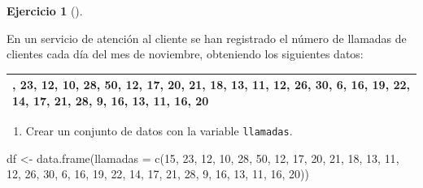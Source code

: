 \documentclass[
  a4paper,
]{scrreport}
\newenvironment{Shaded}{\begin{snugshade}}{\end{snugshade}}
\newcommand{\AttributeTok}[1]{\textcolor[rgb]{0.40,0.45,0.13}{#1}}
\newcommand{\DecValTok}[1]{\textcolor[rgb]{0.68,0.00,0.00}{#1}}
\newcommand{\FunctionTok}[1]{\textcolor[rgb]{0.28,0.35,0.67}{#1}}
\newcommand{\NormalTok}[1]{\textcolor[rgb]{0.00,0.23,0.31}{#1}}
\newcommand{\OtherTok}[1]{\textcolor[rgb]{0.00,0.23,0.31}{#1}}
\providecommand{\tightlist}{%
  \setlength{\itemsep}{0pt}\setlength{\parskip}{0pt}}\usepackage{longtable,booktabs,array}
\theoremstyle{definition}
\newtheorem{exercise}{Ejercicio}[chapter]
\theoremstyle{remark}
\begin{document}
\leavevmode{}%
\begin{exercise}[]\label{exr-2}

En un servicio de atención al cliente se han registrado el número de
llamadas de clientes cada día del mes de noviembre, obteniendo los
siguientes datos:

\begin{longtable}[]{@{}
  >{\centering\arraybackslash}p{}@{}}
\toprule()
\endhead
15, 23, 12, 10, 28, 50, 12, 17, 20, 21, 18, 13, 11, 12, 26, 30, 6, 16,
19, 22, 14, 17, 21, 28, 9, 16, 13, 11, 16, 20 \\
\bottomrule()
\end{longtable}

\begin{enumerate}
\def\labelenumi{\alph{enumi}.}
\tightlist
\item
  Crear un conjunto de datos con la variable \texttt{llamadas}.
\end{enumerate}

\begin{tcolorbox}[enhanced jigsaw, rightrule=.15mm, toptitle=1mm, colbacktitle=quarto-callout-tip-color!10!white, titlerule=0mm, colback=white, leftrule=.75mm, bottomtitle=1mm, colframe=quarto-callout-tip-color-frame, breakable, title=\textcolor{quarto-callout-tip-color}{\faLightbulb}\hspace{0.5em}{Solución}, arc=.35mm, coltitle=black, opacityback=0, bottomrule=.15mm, opacitybacktitle=0.6, left=2mm, toprule=.15mm]

\begin{Shaded}
\begin{Highlighting}[]
\NormalTok{df }\OtherTok{\textless{}{-}} \FunctionTok{data.frame}\NormalTok{(}\AttributeTok{llamadas =} \FunctionTok{c}\NormalTok{(}\DecValTok{15}\NormalTok{, }\DecValTok{23}\NormalTok{, }\DecValTok{12}\NormalTok{, }\DecValTok{10}\NormalTok{, }\DecValTok{28}\NormalTok{, }\DecValTok{50}\NormalTok{, }\DecValTok{12}\NormalTok{, }\DecValTok{17}\NormalTok{, }\DecValTok{20}\NormalTok{, }\DecValTok{21}\NormalTok{, }\DecValTok{18}\NormalTok{, }\DecValTok{13}\NormalTok{, }\DecValTok{11}\NormalTok{, }\DecValTok{12}\NormalTok{, }\DecValTok{26}\NormalTok{, }\DecValTok{30}\NormalTok{, }\DecValTok{6}\NormalTok{, }\DecValTok{16}\NormalTok{, }\DecValTok{19}\NormalTok{, }\DecValTok{22}\NormalTok{, }\DecValTok{14}\NormalTok{, }\DecValTok{17}\NormalTok{, }\DecValTok{21}\NormalTok{, }\DecValTok{28}\NormalTok{, }\DecValTok{9}\NormalTok{, }\DecValTok{16}\NormalTok{, }\DecValTok{13}\NormalTok{, }\DecValTok{11}\NormalTok{, }\DecValTok{16}\NormalTok{, }\DecValTok{20}\NormalTok{))}
\end{Highlighting}
\end{Shaded}


\end{tcolorbox}
\end{exercise}
\end{document}
